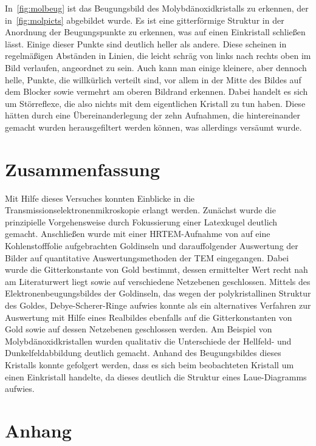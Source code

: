 \documentclass[slug=TEM, room=IFW, supervisor=?, coursedate=23.\ 01.\ 2020]{../../Lab_Report_LaTeX/lab_report}
\begin{document}
In~\ref{fig:molbeug} ist das Beugungsbild des Molybdänoxidkristalls zu erkennen, der
in~\ref{fig:molpicts} abgebildet wurde. Es ist eine gitterförmige Struktur in der Anordnung der
Beugungspunkte zu erkennen, was auf einen Einkristall schließen lässt. Einige dieser Punkte sind
deutlich heller als andere. Diese scheinen in regelmäßigen Abständen in Linien, die leicht
schräg von links nach rechts oben im Bild verlaufen, angeordnet zu sein. Auch kann man einige
kleinere, aber dennoch helle, Punkte, die willkürlich verteilt sind, vor allem in der Mitte des
Bildes auf dem Blocker sowie vermehrt am oberen Bildrand erkennen. Dabei handelt es sich um
Störreflexe, die also nichts mit dem eigentlichen Kristall zu tun haben. Diese hätten durch eine
Übereinanderlegung der zehn Aufnahmen, die hintereinander gemacht wurden herausgefiltert werden
können, was allerdings versäumt wurde.

\section{Zusammenfassung}
\label{sec:zusfassung}

Mit Hilfe dieses Versuches konnten Einblicke in die Transmissionselektronenmikroskopie erlangt
werden. Zunächst wurde die prinzipielle Vorgehensweise durch Fokussierung einer Latexkugel
deutlich gemacht. Anschließen wurde mit einer HRTEM-Aufnahme von auf eine Kohlenstofffolie
aufgebrachten Goldinseln und darauffolgender Auswertung der Bilder auf quantitative
Auswertungsmethoden der TEM eingegangen. Dabei wurde die Gitterkonstante von Gold bestimmt, dessen
ermittelter Wert recht nah am Literaturwert liegt sowie auf verschiedene Netzebenen geschlossen. 
Mittels des Elektronenbeugungsbildes der Goldinseln, das wegen der polykristallinen Struktur des 
Goldes, Debye-Scherer-Ringe aufwies konnte als ein alternatives Verfahren zur Auswertung mit 
Hilfe eines Realbildes ebenfalls auf die Gitterkonstanten von Gold sowie auf dessen Netzebenen 
geschlossen werden. Am Beispiel von Molybdänoxidkristallen wurden qualitativ die Unterschiede der 
Hellfeld- und Dunkelfeldabbildung deutlich gemacht. Anhand des Beugungsbildes dieses Kristalls 
konnte gefolgert werden, dass es sich beim beobachteten Kristall um einen Einkristall handelte, da
dieses deutlich die Struktur eines Laue-Diagramms aufwies. 

\section{Anhang}
\label{sec:anhang}
\end{document}
